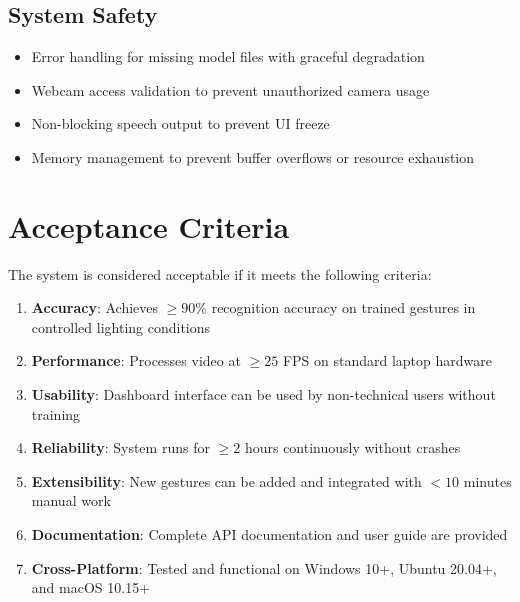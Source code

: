 \subsection{System Safety}

\begin{itemize}
    \item Error handling for missing model files with graceful degradation
    \item Webcam access validation to prevent unauthorized camera usage
    \item Non-blocking speech output to prevent UI freeze
    \item Memory management to prevent buffer overflows or resource exhaustion
\end{itemize}

\section{Acceptance Criteria}

The system is considered acceptable if it meets the following criteria:

\begin{enumerate}
    \item \textbf{Accuracy}: Achieves $\geq 90\%$ recognition accuracy on trained gestures in controlled lighting conditions
    \item \textbf{Performance}: Processes video at $\geq 25$ FPS on standard laptop hardware
    \item \textbf{Usability}: Dashboard interface can be used by non-technical users without training
    \item \textbf{Reliability}: System runs for $\geq 2$ hours continuously without crashes
    \item \textbf{Extensibility}: New gestures can be added and integrated with $< 10$ minutes manual work
    \item \textbf{Documentation}: Complete API documentation and user guide are provided
    \item \textbf{Cross-Platform}: Tested and functional on Windows 10+, Ubuntu 20.04+, and macOS 10.15+
\end{enumerate}
